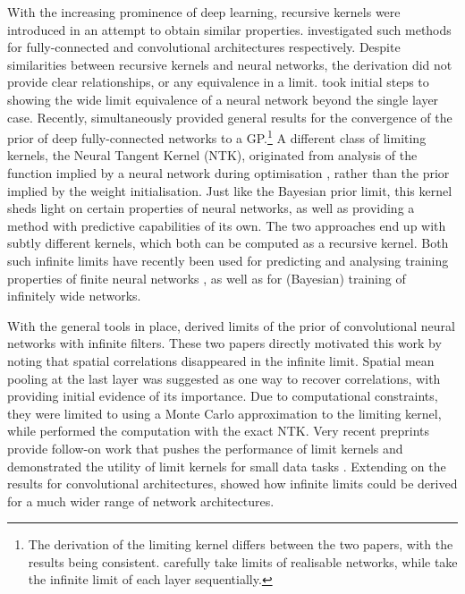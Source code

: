 \documentclass[accepted]{uai2021} %
\newcommand{\0}{\boldsymbol{0}}
\newcommand{\1}{\boldsymbol{1}}
\begin{document}
With the increasing prominence of deep learning, recursive kernels were introduced in an attempt to obtain similar properties. \citet{cho2009mkm,mairal2014ckn} investigated such methods for fully-connected and convolutional architectures respectively. Despite similarities between recursive kernels and neural networks, the derivation did not provide clear relationships, or any equivalence in a limit. \citet{hazan2015} took initial steps to showing the wide limit equivalence of a neural network beyond the single layer case. Recently, \citet{matthews2018dnnlimit,lee2018dnnlimit} simultaneously provided general results for the convergence of the prior of deep fully-connected networks to a GP.\footnote{The derivation of the limiting kernel differs between the two papers, with the results being consistent. \citet{matthews2018dnnlimit} carefully take limits of realisable networks, while \citet{lee2018dnnlimit} take the infinite limit of each layer sequentially.%
} 
A different class of limiting kernels, the Neural Tangent Kernel (NTK), originated from analysis of the function implied by a neural network during optimisation \citep{jacot2018ntk}, rather than the prior implied by the weight initialisation. Just like the Bayesian prior limit, this kernel sheds light on certain properties of neural networks, as well as providing a method with predictive capabilities of its own. 
The two approaches end up with subtly different kernels, which both can be computed as a recursive kernel. Both such infinite limits have recently been used for predicting and analysing training properties of finite neural networks \citep{poole2016,schoenholz2017deepinformationpropagation,hayou2019activation}, as well as for (Bayesian) training of infinitely wide networks.

With the general tools in place, \citet{garriga2018infiniteconv,novak2019infiniteconv} derived limits of the prior of convolutional neural networks with infinite filters. %
These two papers directly motivated this work by noting that spatial correlations disappeared in the infinite limit. Spatial mean pooling at the last layer was suggested as one way to recover correlations, with \citet{novak2019infiniteconv} providing initial evidence of its importance. Due to computational constraints, they were limited to using a Monte Carlo approximation to the limiting kernel, while \citet{arora2019exact} performed the computation with the exact NTK. Very recent preprints provide follow-on work that pushes the performance of limit kernels \citep{shankar2020without} and demonstrated the utility of limit kernels for small data tasks \citep{arora2020small}. Extending on the results for convolutional architectures, \citet{yang2019wide} showed how infinite limits could be derived for a much wider range of network architectures.
\end{document}
